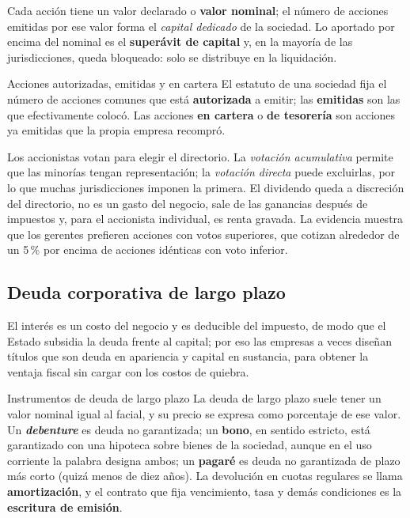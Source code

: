 Cada acción tiene un valor declarado o \textbf{valor nominal}; el número de acciones emitidas por ese valor forma el \emph{capital dedicado} de la sociedad. Lo aportado por encima del nominal es el \textbf{superávit de capital} y, en la mayoría de las jurisdicciones, queda bloqueado: solo se distribuye en la liquidación.

\begin{definicion}{Acciones autorizadas, emitidas y en cartera}
El estatuto de una sociedad fija el número de acciones comunes que está \textbf{autorizada} a emitir; las \textbf{emitidas} son las que efectivamente colocó. Las acciones \textbf{en cartera} o \textbf{de tesorería} son acciones ya emitidas que la propia empresa recompró.
\end{definicion}

Los accionistas votan para elegir el directorio. La \emph{votación acumulativa} permite que las minorías tengan representación; la \emph{votación directa} puede excluirlas, por lo que muchas jurisdicciones imponen la primera. El dividendo queda a discreción del directorio, no es un gasto del negocio, sale de las ganancias después de impuestos y, para el accionista individual, es renta gravada. La evidencia muestra que los gerentes prefieren acciones con votos superiores, que cotizan alrededor de un 5\,\% por encima de acciones idénticas con voto inferior.

\subsection{Deuda corporativa de largo plazo}

El interés es un costo del negocio y es deducible del impuesto, de modo que el Estado subsidia la deuda frente al capital; por eso las empresas a veces diseñan títulos que son deuda en apariencia y capital en sustancia, para obtener la ventaja fiscal sin cargar con los costos de quiebra.

\begin{definicion}{Instrumentos de deuda de largo plazo}
La deuda de largo plazo suele tener un valor nominal igual al facial, y su precio se expresa como porcentaje de ese valor. Un \textbf{\emph{debenture}} es deuda no garantizada; un \textbf{bono}, en sentido estricto, está garantizado con una hipoteca sobre bienes de la sociedad, aunque en el uso corriente la palabra designa ambos; un \textbf{pagaré} es deuda no garantizada de plazo más corto (quizá menos de diez años). La devolución en cuotas regulares se llama \textbf{amortización}, y el contrato que fija vencimiento, tasa y demás condiciones es la \textbf{escritura de emisión}.
\end{definicion}


